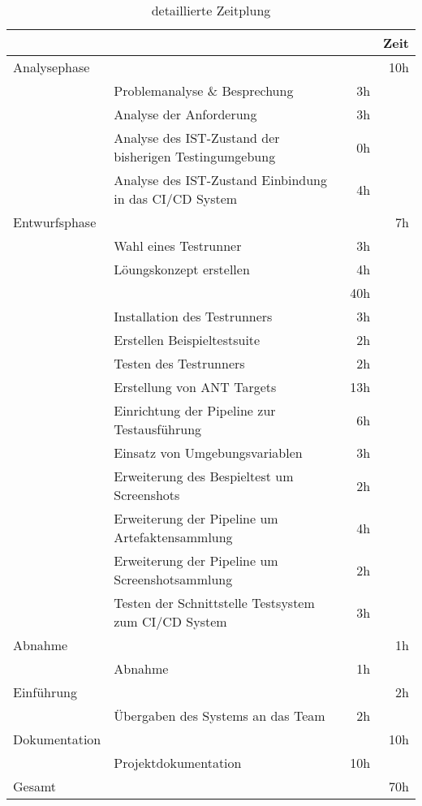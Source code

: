 \begin{table}[h]
\begin{tabular}{llrr}
\rowcolor{gragreen}\multicolumn{1}{l}{\bf{Projektphase}} & \multicolumn{1}{l}{ } & \multicolumn{1}{l}{\bf{ }} & \multicolumn{1}{l}{\bf{Zeit}} \\
\hline
\rowcolor{heading}Analysephase &  &  & 10h \\
 & Problemanalyse \& Besprechung & 3h &  \\
\rowcolor{odd} & Analyse der Anforderung & 3h &  \\
& Analyse des IST-Zustand der bisherigen Testingumgebung & 0h &  \\
 \rowcolor{odd}& Analyse des IST-Zustand Einbindung in das CI/CD System & 4h &  \\
\rowcolor{heading}Entwurfsphase &  &  & 7h \\
 & Wahl eines Testrunner & 3h &  \\
 \rowcolor{odd} & Löungskonzept erstellen & 4h &  \\
\rowcolor{heading}\multicolumn{2}{l}{Implementierungsphase}   &  & 40h \\
 & Installation des Testrunners & 3h &  \\
 \rowcolor{odd}& Erstellen Beispieltestsuite & 2h &  \\
 & Testen des Testrunners & 2h &  \\
\rowcolor{odd} & Erstellung von ANT Targets & 13h &  \\
 & Einrichtung der Pipeline zur Testausführung & 6h &  \\
\rowcolor{odd} & Einsatz von Umgebungsvariablen & 3h &  \\
 & Erweiterung des Bespieltest um Screenshots & 2h &  \\
\rowcolor{odd} & Erweiterung der Pipeline um Artefaktensammlung & 4h &  \\
 & Erweiterung der Pipeline um Screenshotsammlung & 2h &  \\
\rowcolor{odd} & Testen der Schnittstelle Testsystem zum CI/CD System & 3h &  \\
\rowcolor{heading}Abnahme &  &  & 1h \\
 & Abnahme & 1h &  \\
\rowcolor{heading}Einführung &  &  & 2h \\
 & Übergaben des Systems an das Team & 2h &  \\
\rowcolor{heading}Dokumentation &  &  & 10h \\
 & Projektdokumentation & 10h & \\
\hline
\rowcolor{heading}Gesamt &  &  & 70h
\end{tabular}
\caption{detaillierte Zeitplung}
\label{table:detailtimetable}
\end{table}